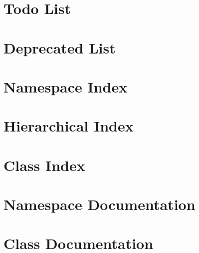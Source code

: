 \documentclass[twoside]{book}
\begin{document}
\chapter{Todo List}
\label{todo}
\hypertarget{todo}{}

\chapter{Deprecated List}
\label{deprecated}
\hypertarget{deprecated}{}

\chapter{Namespace Index}

\chapter{Hierarchical Index}

\chapter{Class Index}

\chapter{Namespace Documentation}


\chapter{Class Documentation}

























\newpage
{}
{}
\printindex
\end{document}
